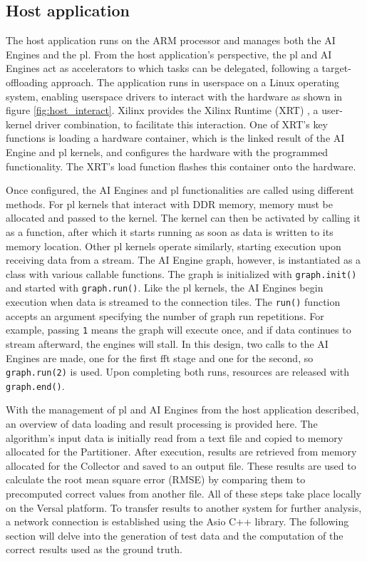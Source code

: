 \subsection{Host application}
The host application runs on the ARM processor and manages both the AI Engines and the \ac{pl}. From the host application’s perspective, the \ac{pl} and AI Engines act as accelerators to which tasks can be delegated, following a target-offloading approach. The application runs in userspace on a Linux operating system, enabling userspace drivers to interact with the hardware as shown in figure \ref{fig:host_interact}. Xilinx provides the Xilinx Runtime (XRT) \cite{xrt}, a user-kernel driver combination, to facilitate this interaction. One of XRT’s key functions is loading a hardware container, which is the linked result of the AI Engine and \ac{pl} kernels, and configures the hardware with the programmed functionality. The XRT’s load function flashes this container onto the hardware.\par
Once configured, the AI Engines and \ac{pl} functionalities are called using different methods. For \ac{pl} kernels that interact with DDR memory, memory must be allocated and passed to the kernel. The kernel can then be activated by calling it as a function, after which it starts running as soon as data is written to its memory location. Other \ac{pl} kernels operate similarly, starting execution upon receiving data from a stream. The AI Engine graph, however, is instantiated as a class with various callable functions. The graph is initialized with \texttt{graph.init()} and started with \texttt{graph.run()}. Like the \ac{pl} kernels, the AI Engines begin execution when data is streamed to the connection tiles. The \texttt{run()} function accepts an argument specifying the number of graph run repetitions. For example, passing \texttt{1} means the graph will execute once, and if data continues to stream afterward, the engines will stall. In this design, two calls to the AI Engines are made, one for the first \ac{fft} stage and one for the second, so \texttt{graph.run(2)} is used. Upon completing both runs, resources are released with \texttt{graph.end()}.\par
With the management of \ac{pl} and AI Engines from the host application described, an overview of data loading and result processing is provided here. The algorithm’s input data is initially read from a text file and copied to memory allocated for the Partitioner. After execution, results are retrieved from memory allocated for the Collector and saved to an output file. These results are used to calculate the root mean square error (RMSE) by comparing them to precomputed correct values from another file. All of these steps take place locally on the Versal platform. To transfer results to another system for further analysis, a network connection is established using the Asio C++ library. The following section will delve into the generation of test data and the computation of the correct results used as the ground truth.\par


